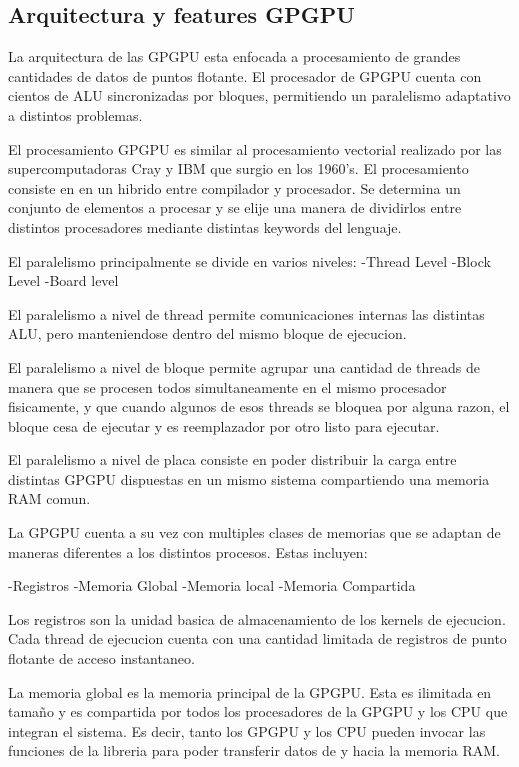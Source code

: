 \subsection{Arquitectura y features GPGPU}

La arquitectura de las GPGPU esta enfocada a procesamiento de grandes cantidades de datos
de puntos flotante. El procesador de GPGPU cuenta con cientos de ALU sincronizadas
por bloques, permitiendo un paralelismo adaptativo a distintos problemas.

El procesamiento GPGPU es similar al procesamiento vectorial 
realizado por las supercomputadoras Cray y IBM que surgio en los 1960's.
El procesamiento consiste en en un hibrido entre compilador y procesador. Se determina
un conjunto de elementos a procesar y se elije una manera de dividirlos entre distintos
procesadores mediante distintas keywords del lenguaje. 

El paralelismo principalmente se divide en varios niveles:
-Thread Level
-Block Level
-Board level

El paralelismo a nivel de thread permite comunicaciones internas las distintas ALU, pero
manteniendose dentro del mismo bloque de ejecucion.

El paralelismo a nivel de bloque permite agrupar una cantidad de threads de manera
que se procesen todos simultaneamente en el mismo procesador fisicamente, y que
cuando algunos de esos threads se bloquea por alguna razon, el bloque cesa de ejecutar
y es reemplazador por otro listo para ejecutar.

El paralelismo a nivel de placa consiste en poder distribuir la carga entre distintas
GPGPU dispuestas en un mismo sistema compartiendo una memoria RAM comun. 

La GPGPU cuenta a su vez con multiples clases de memorias que se adaptan de maneras
diferentes a los distintos procesos. Estas incluyen:

-Registros
-Memoria Global
-Memoria local
-Memoria Compartida

Los registros son la unidad basica de almacenamiento de los kernels de ejecucion.
Cada thread de ejecucion cuenta con una cantidad limitada de registros de punto flotante de
acceso instantaneo. 

La memoria global es la memoria principal de la GPGPU. Esta es ilimitada en tama\~no 
y es compartida por todos los procesadores de la GPGPU y los CPU que integran el 
sistema. Es decir, tanto los GPGPU y los CPU pueden invocar las funciones de la libreria
para poder transferir datos de y hacia la memoria RAM.

